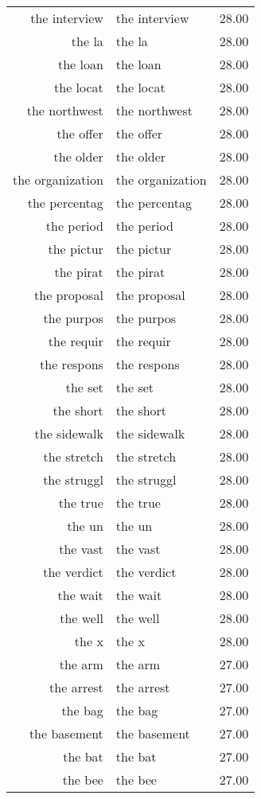 \begin{table}[ht]
\begin{tabular}{rlr}
  the interview & the interview & 28.00 \\ 
  the la & the la & 28.00 \\ 
  the loan & the loan & 28.00 \\ 
  the locat & the locat & 28.00 \\ 
  the northwest & the northwest & 28.00 \\ 
  the offer & the offer & 28.00 \\ 
  the older & the older & 28.00 \\ 
  the organization & the organization & 28.00 \\ 
  the percentag & the percentag & 28.00 \\ 
  the period & the period & 28.00 \\ 
  the pictur & the pictur & 28.00 \\ 
  the pirat & the pirat & 28.00 \\ 
  the proposal & the proposal & 28.00 \\ 
  the purpos & the purpos & 28.00 \\ 
  the requir & the requir & 28.00 \\ 
  the respons & the respons & 28.00 \\ 
  the set & the set & 28.00 \\ 
  the short & the short & 28.00 \\ 
  the sidewalk & the sidewalk & 28.00 \\ 
  the stretch & the stretch & 28.00 \\ 
  the struggl & the struggl & 28.00 \\ 
  the true & the true & 28.00 \\ 
  the un & the un & 28.00 \\ 
  the vast & the vast & 28.00 \\ 
  the verdict & the verdict & 28.00 \\ 
  the wait & the wait & 28.00 \\ 
  the well & the well & 28.00 \\ 
  the x & the x & 28.00 \\ 
  the arm & the arm & 27.00 \\ 
  the arrest & the arrest & 27.00 \\ 
  the bag & the bag & 27.00 \\ 
  the basement & the basement & 27.00 \\ 
  the bat & the bat & 27.00 \\ 
  the bee & the bee & 27.00 \\ 

\end{tabular}
\end{table}
